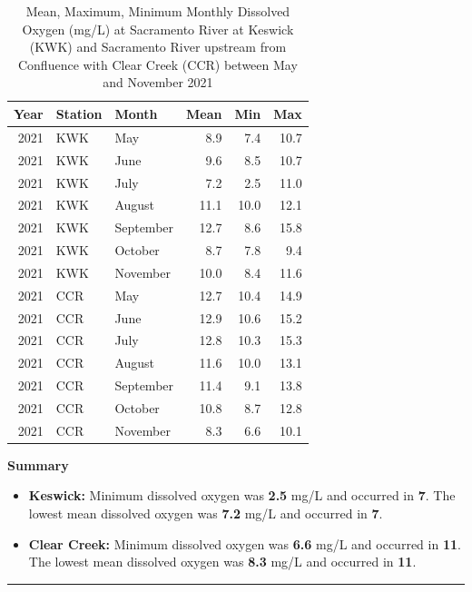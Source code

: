 \documentclass[
]{book}
\providecommand{\tightlist}{%
  \setlength{\itemsep}{0pt}\setlength{\parskip}{0pt}}
\theoremstyle{definition}
\theoremstyle{definition}
\theoremstyle{definition}
\theoremstyle{definition}
\theoremstyle{remark}
\begin{document}
\begin{table}
\centering
\caption{Mean, Maximum, Minimum Monthly Dissolved Oxygen (mg/L) at Sacramento River at Keswick (KWK) and Sacramento River upstream from Confluence with Clear Creek (CCR) between May and November 2021}
\centering
\begin{tabular}[t]{rllrrr}
\hline
Year & Station & Month & Mean & Min & Max\\
\hline
2021 & KWK & May & 8.9 & 7.4 & 10.7\\
\hline
2021 & KWK & June & 9.6 & 8.5 & 10.7\\
\hline
2021 & KWK & July & 7.2 & 2.5 & 11.0\\
\hline
2021 & KWK & August & 11.1 & 10.0 & 12.1\\
\hline
2021 & KWK & September & 12.7 & 8.6 & 15.8\\
\hline
2021 & KWK & October & 8.7 & 7.8 & 9.4\\
\hline
2021 & KWK & November & 10.0 & 8.4 & 11.6\\
\hline
2021 & CCR & May & 12.7 & 10.4 & 14.9\\
\hline
2021 & CCR & June & 12.9 & 10.6 & 15.2\\
\hline
2021 & CCR & July & 12.8 & 10.3 & 15.3\\
\hline
2021 & CCR & August & 11.6 & 10.0 & 13.1\\
\hline
2021 & CCR & September & 11.4 & 9.1 & 13.8\\
\hline
2021 & CCR & October & 10.8 & 8.7 & 12.8\\
\hline
2021 & CCR & November & 8.3 & 6.6 & 10.1\\
\hline
\end{tabular}
\end{table}

\textbf{Summary}

\begin{itemize}
\tightlist
\item
  \textbf{Keswick:} Minimum dissolved oxygen was \textbf{2.5} mg/L and occurred in \textbf{7}. The lowest mean dissolved oxygen was \textbf{7.2} mg/L and occurred in \textbf{7}.
\item
  \textbf{Clear Creek:} Minimum dissolved oxygen was \textbf{6.6} mg/L and occurred in \textbf{11}. The lowest mean dissolved oxygen was \textbf{8.3} mg/L and occurred in \textbf{11}.
\end{itemize}

\begin{center}\rule{0.5\linewidth}{0.5pt}\end{center}
\end{document}
